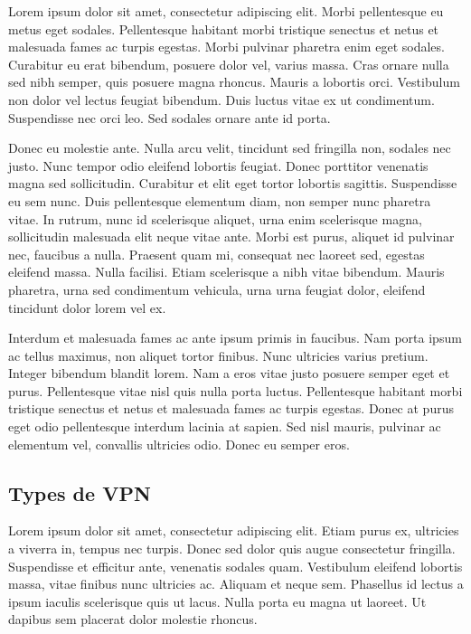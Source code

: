 \documentclass{report}
\begin{document}
Lorem ipsum dolor sit amet, consectetur adipiscing elit. Morbi pellentesque eu metus eget sodales. Pellentesque habitant morbi tristique senectus et netus et malesuada fames ac turpis egestas. Morbi pulvinar pharetra enim eget sodales. Curabitur eu erat bibendum, posuere dolor vel, varius massa. Cras ornare nulla sed nibh semper, quis posuere magna rhoncus. Mauris a lobortis orci. Vestibulum non dolor vel lectus feugiat bibendum. Duis luctus vitae ex ut condimentum. Suspendisse nec orci leo. Sed sodales ornare ante id porta.

Donec eu molestie ante. Nulla arcu velit, tincidunt sed fringilla non, sodales nec justo. Nunc tempor odio eleifend lobortis feugiat. Donec porttitor venenatis magna sed sollicitudin. Curabitur et elit eget tortor lobortis sagittis. Suspendisse eu sem nunc. Duis pellentesque elementum diam, non semper nunc pharetra vitae. In rutrum, nunc id scelerisque aliquet, urna enim scelerisque magna, sollicitudin malesuada elit neque vitae ante. Morbi est purus, aliquet id pulvinar nec, faucibus a nulla. Praesent quam mi, consequat nec laoreet sed, egestas eleifend massa. Nulla facilisi. Etiam scelerisque a nibh vitae bibendum. Mauris pharetra, urna sed condimentum vehicula, urna urna feugiat dolor, eleifend tincidunt dolor lorem vel ex.

Interdum et malesuada fames ac ante ipsum primis in faucibus. Nam porta ipsum ac tellus maximus, non aliquet tortor finibus. Nunc ultricies varius pretium. Integer bibendum blandit lorem. Nam a eros vitae justo posuere semper eget et purus. Pellentesque vitae nisl quis nulla porta luctus. Pellentesque habitant morbi tristique senectus et netus et malesuada fames ac turpis egestas. Donec at purus eget odio pellentesque interdum lacinia at sapien. Sed nisl mauris, pulvinar ac elementum vel, convallis ultricies odio. Donec eu semper eros.

\subsection{Types de VPN}

Lorem ipsum dolor sit amet, consectetur adipiscing elit. Etiam purus ex, ultricies a viverra in, tempus nec turpis. Donec sed dolor quis augue consectetur fringilla. Suspendisse et efficitur ante, venenatis sodales quam. Vestibulum eleifend lobortis massa, vitae finibus nunc ultricies ac. Aliquam et neque sem. Phasellus id lectus a ipsum iaculis scelerisque quis ut lacus. Nulla porta eu magna ut laoreet. Ut dapibus sem placerat dolor molestie rhoncus.
\end{document}
